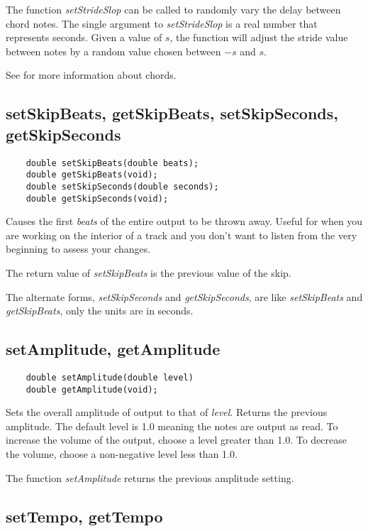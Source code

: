 \documentclass{article}
\begin{document}
The function {\it setStrideSlop} can be called to randomly vary the delay
between chord notes. The single argument to {\it setStrideSlop}
is a real number that represents seconds. Given a value of $s$, the function 
will adjust the stride value between notes by a random value chosen
between $-s$ and $s$.

See  for more information about chords.

\subsection*{setSkipBeats, getSkipBeats, setSkipSeconds, getSkipSeconds}

\begin{verbatim}
    double setSkipBeats(double beats);
    double getSkipBeats(void);
    double setSkipSeconds(double seconds);
    double getSkipSeconds(void);
\end{verbatim}

Causes the first {\it beats} of the entire output to be thrown away. Useful for
when you are working on the interior of a track and you don't want to
listen from the very beginning to assess your changes.

The return value of {\it setSkipBeats} is the previous value of the skip.

The alternate forms, {\it setSkipSeconds} and {\it getSkipSeconds}, are 
like {\it setSkipBeats} and {\it getSkipBeats}, only the units are in seconds.

\subsection*{setAmplitude, getAmplitude}

\begin{verbatim}
    double setAmplitude(double level)
    double getAmplitude(void);
\end{verbatim}

Sets the overall amplitude of output to that of {\it level}. Returns the
previous amplitude. The default level is 1.0 meaning the notes are output
as read. To increase the volume of the output, choose a level greater than
1.0. To decrease the volume, choose a non-negative level less than 1.0.

The function {\it setAmplitude} returns the previous amplitude setting.

\subsection*{setTempo, getTempo}
\end{document}
